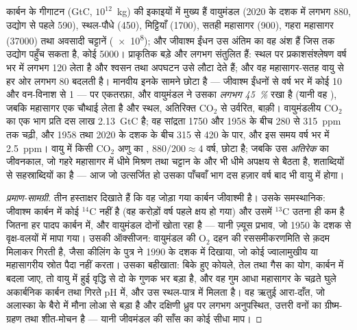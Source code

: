 \begin{proposition}[कार्बन बजट]\label{prop:b2:biogeochemical-cycles:carbon}
कार्बन के गीगाटन (\unit{GtC}, $10^{12}$~kg) की इकाइयों में मुख्य
 हैं वायुमंडल (2020 के दशक में लगभग 880, उद्योग से
पहले 590), स्थल-पौधे (450), मिट्टियाँ (1700), सतही
महासागर (900), गहरा महासागर (\num{37000}) तथा अवसादी चट्टानें
(\num{e8}); और जीवाश्म ईंधन उस अंतिम का वह अंश हैं जिस तक
उद्योग पहुँच सकता है, कोई \num{5000}। प्राकृतिक  बड़े
और लगभग संतुलित हैं: स्थल पर प्रकाशसंश्लेषण वर्ष भर में लगभग 120 लेता
है और श्वसन तथा अपघटन उसे लौटा देते हैं; और वह
महासागर-सतह वायु से हर ओर लगभग 80 बदलती है। मानवीय 
इनके सामने छोटा है --- जीवाश्म ईंधनों से वर्ष भर में कोई 10 और
वन-विनाश से 1 --- पर एकतरफ़ा, और वायुमंडल ने उसका
\emph{लगभग \qty{45}{\%}} रखा है (यानी वह \emph{}),
जबकि महासागर एक चौथाई लेता है और स्थल, अतिरिक्त
$\mathrm{CO_2}$ से उर्वरित, बाक़ी। वायुमंडलीय $\mathrm{CO_2}$ का एक भाग प्रति दस लाख
\qty{2.13}{GtC} है; वह सांद्रता 1750 और 1958 के बीच 280 से
\num{315}~ppm तक चढ़ी, और 1958 तथा 2020 के दशक के बीच 315 से
\num{420} के पार, और इस समय वर्ष भर में \qty{2.5}{ppm}। वायु में किसी
$\mathrm{CO_2}$ अणु का , $880/200 \approx 4$ वर्ष,
छोटा है; जबकि उस \emph{अतिरेक} का जीवनकाल, जो गहरे महासागर में धीमे
मिश्रण तथा चट्टान के और भी धीमे अपक्षय से बैठता है,
शताब्दियों से सहस्राब्दियों का है --- आज जो उत्सर्जित हो उसका पाँचवाँ भाग
दस हज़ार वर्ष बाद भी वायु में होगा।
\end{proposition}
\begin{proof}[प्रमाण-सामग्री]
तीन हस्ताक्षर दिखाते हैं कि वह जोड़ा गया कार्बन जीवाश्मी है। उसके
समस्थानिक: जीवाश्म कार्बन में कोई $\mathrm{{}^{14}C}$ नहीं है (वह
करोड़ों वर्ष पहले क्षय हो गया) और उसमें $\mathrm{{}^{13}C}$ उतना ही कम है जितना हर पादप
कार्बन में, और वायुमंडल दोनों खोता रहा है --- यानी ज़्यूस
प्रभाव, जो 1950 के दशक से वृक्ष-वलयों में मापा गया। उसकी ऑक्सीजन:
वायुमंडल की $\mathrm{O_2}$ दहन की रससमीकरणमिति से
क़दम मिलाकर गिरती है, जैसा कीलिंग के पुत्र ने 1990 के दशक में दिखाया, जो कोई ज्वालामुखीय
या महासागरीय स्रोत पैदा नहीं करता। उसका बहीखाता: बिके हुए
कोयले, तेल तथा गैस का योग, कार्बन में बदला जाए, तो वायु में हुई वृद्धि से
दो के गुणक भर बड़ा है, और वह गुम आधा महासागर के चढ़ते
घुले अकार्बनिक कार्बन तथा गिरते pH में, और
उस स्थल-पात्र में मिलता है। वह ऋतुई आरा-दाँत, जो अलास्का के बैरो में मौना लोआ से
बड़ा है और दक्षिणी ध्रुव पर लगभग अनुपस्थित,
उत्तरी वनों का ग्रीष्म-ग्रहण तथा शीत-मोचन है --- यानी जीवमंडल की साँस का
कोई सीधा माप।
\end{proof}

